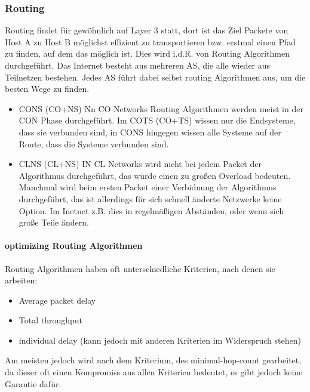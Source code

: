         \subsubsection{Routing}
            Routing findet für gewöhnlich auf Layer 3 statt, dort ist das Ziel Packete von Host A zu Host B möglichst effizient zu transportieren bzw. erstmal einen Pfad zu finden, auf dem das möglich ist. Dies wird i.d.R. von Routing Algorithmen durchgeführt. Das Internet besteht aus mehreren AS, die alle wieder aus Teilnetzen bestehen. Jedes AS führt dabei selbst routing Algorithmen aus, um die besten Wege zu finden. 
            \begin{itemize}
                \item CONS (CO+NS)
                    Nn CO Networks Routing Algorithmen werden meist in der CON Phase durchgeführt. Im COTS (CO+TS) wissen nur die Endsysteme, dass sie verbunden sind, in CONS hingegen wissen alle Systeme auf der Route, dass die Systeme verbunden sind.
                \item CLNS (CL+NS)
                    IN CL Networks wird nicht bei jedem Packet der Algorithmus durchgeführt, das würde einen zu großen Overload bedeuten. Manchmal wird beim ersten Packet einer Verbidnung der Algorithmus durchgeführt, das ist allerdings für sich schnell änderte Netzwerke keine Option. Im Inetnet z.B. dies in regelmäßigen Abständen, oder wenn sich große Teile ändern.
            \end{itemize}
            
        \paragraph{optimizing Routing Algorithmen}
            Routing Algorithmen haben oft unterschiedliche Kriterien, nach denen sie arbeiten:
            \begin{itemize}
                \item Average packet delay
                \item Total throughput
                \item individual delay (kann jedoch mit anderen Kriterien im Widerspruch stehen)
            \end{itemize}
            Am meisten jedoch wird nach dem Kriterium, des minimal-hop-count gearbeitet, da dieser oft einen Kompromiss aus allen Kriterien bedeutet, es gibt jedoch keine Garantie dafür. 
    
